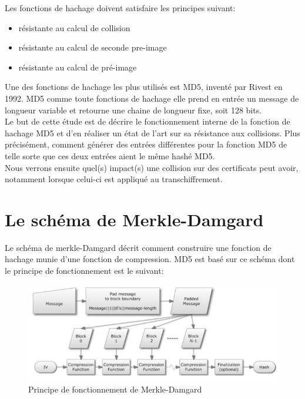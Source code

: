 \documentclass[a4paper,11pt,french]{article}
\begin{document}
Les fonctions de hachage doivent satisfaire les principes suivant:
\begin{itemize}
  \item résistante au calcul de collision
  \item résistante au calcul de seconde pre-image
  \item résistante au calcul de pré-image
\end{itemize}
\vspace{.5cm}

Une des fonctions de hachage les plus utilisés est MD5, inventé par Rivest en 1992. MD5 comme toute fonctions de hachage elle prend en entrée un message de longueur variable et retourne une chaine de longueur fixe, soit 128 bits.\\

Le but de cette étude est de décrire le fonctionnement interne de la fonction de hachage MD5 et d'en réaliser un état de l'art sur sa résistance aux collisions. Plus précisément, comment générer des entrées différentes pour la fonction MD5 de telle sorte que ces deux entrées aient le même hashé MD5.\\
Nous verrons ensuite quel(s) impact(s) une collision sur des certificats peut avoir, notamment lorsque celui-ci est appliqué au transchiffrement.

\section{Le schéma de Merkle-Damgard}
Le schéma de merkle-Damgard décrit comment construire une fonction de hachage munie d'une fonction de compression. MD5 est basé sur ce schéma dont le principe de fonctionnement est le suivant:\\

\begin{figure}[h!]
  \includegraphics[scale=.61]{./pics/md.png}
  \caption{Principe de fonctionnement de Merkle-Damgard}
\end{figure}
\end{document}
